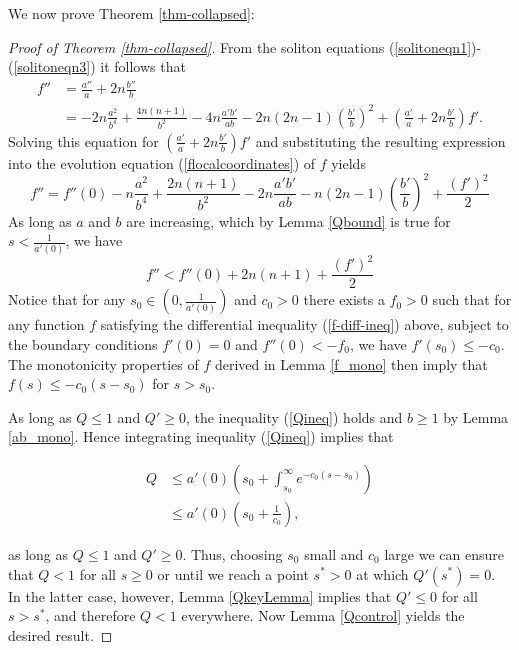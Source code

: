 \documentclass{amsart}
\theoremstyle{definition}
\theoremstyle{remark}
\numberwithin{equation}{section}
\begin{document}
We now prove Theorem \ref{thm-collapsed}:

\begin{proof}[Proof of Theorem \ref{thm-collapsed}]
From the soliton equations (\ref{solitoneqn1})-(\ref{solitoneqn3}) it follows that
\begin{align*}
f'' &= \frac{a''}{a} + 2n \frac{b''}{b} \\ 
	&= - 2n \frac{a^2}{b^4}+ \frac{4n(n+1)}{b^2}- 4n \frac{a'b'}{ab} - 2n(2n-1)\left(\frac{b'}{b}\right)^2 + \left(\frac{a'}{a}+ 2n \frac{b'}{b}\right) f'.
\end{align*}
Solving this equation for $\left(\frac{a'}{a}+ 2n \frac{b'}{b}\right) f'$ and substituting the resulting expression into the evolution equation (\ref{flocalcoordinates}) of $f$ yields
\begin{equation*}
 \label{eqn2} f'' = f''(0) - n \frac{a^2}{b^4}+ \frac{2n(n+1)}{b^2}- 2n \frac{a'b'}{ab}- n(2n-1)\left(\frac{b'}{b}\right)^2 + \frac{(f')^2}{2}
\end{equation*}
As long as $a$ and $b$ are increasing, which by Lemma \ref{Qbound} is true for $s <\frac{1}{a'(0)}$, we have
\begin{equation}
\label{f-diff-ineq}
f'' <  f''(0) + 2n(n+1) + \frac{(f')^2}{2}
\end{equation}
Notice that for any $s_0 \in (0, \frac{1}{a'(0)})$ and $c_0 >0$ there exists a $f_0>0$ such that for any function $f$ satisfying the differential inequality (\ref{f-diff-ineq}) above, subject to the boundary conditions $f'(0)= 0$ and $f''(0) < -f_0$, we have $f'(s_0) \leq -c_0$. The monotonicity properties of $f$ derived in Lemma \ref{f_mono} then imply that $f(s) \leq -c_0(s-s_0)$ for $s>s_0$.

As long as $Q \leq 1$ and $Q' \geq 0$, the inequality (\ref{Qineq}) holds and $b \geq 1$ by Lemma \ref{ab_mono}. Hence integrating inequality (\ref{Qineq}) implies that

\begin{align*}
Q &\leq a'(0) \left(s_0 + \int_{s_0}^{\infty} e^{-c_0(s-s_0)} \right)\\
  &\leq a'(0)\left(s_0 + \frac{1}{c_0} \right),
\end{align*}

as long as $Q \leq 1$ and $Q' \geq 0$. Thus, choosing $s_0$ small and $c_0$ large we can ensure that $Q < 1$ for all $s \geq 0$ or until we reach a point $s^\ast >0$ at which $Q'(s^\ast) = 0$. In the latter case, however, Lemma \ref{QkeyLemma} implies that $Q' \leq 0 $ for all $s > s^\ast$, and therefore $Q < 1$ everywhere. Now Lemma \ref{Qcontrol} yields the desired result.
\end{proof}
\end{document}
